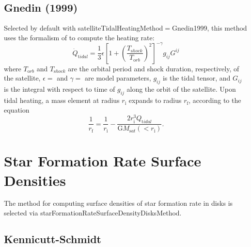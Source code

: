 \subsection{Gnedin (1999)}

Selected by default with {\normalfont \ttfamily satelliteTidalHeatingMethod}$=${\normalfont \ttfamily Gnedin1999}, this method uses the formalism of \cite{gnedin_tidal_1999} to compute the heating rate:
\begin{equation}
\dot{Q}_{\mathrm tidal}=\frac{1}{3}\epsilon\left[1+\left(\frac{T_{\mathrm shock}}{T_{\mathrm orb}}\right)^2\right]^{-\gamma}  g_{ij} G^{ij}
\end{equation}
where $T_{\mathrm orb}$ and $T_{\mathrm shock}$ are the orbital period and shock duration, respectively, of the satellite, $\epsilon=${\normalfont \ttfamily [satelliteTidalHeatingGnedinEpsilon]} and $\gamma=${\normalfont \ttfamily [satelliteTidalHeatingGnedinGamma]} are model parameters, $g_{ij}$ is the tidal tensor, and $G_{ij}$ is the integral with respect to time of $g_{ij}$ along the orbit of the satellite.  Upon tidal heating, a mass element at radius $r_{\mathrm i}$ expands to radius $r_{\mathrm f}$, according to the equation
\begin{equation}
\frac{1}{r_{\mathrm f}}=\frac{1}{r_{\mathrm i}}-\frac{2r_{\mathrm i}^3Q_{\mathrm tidal}}{{\mathrm G}M_{\mathrm sat}(<r_{\mathrm i})}.
\end{equation}

\section{Star Formation Rate Surface Densities}\label{sec:StarFormationRateSurfaceDensity}

The method for computing surface densities of star formation rate in disks is selected via {\normalfont \ttfamily starFormationRateSurfaceDensityDisksMethod}.

\subsection{Kennicutt-Schmidt}\label{sec:StarFormationKennicuttSchmidt}

